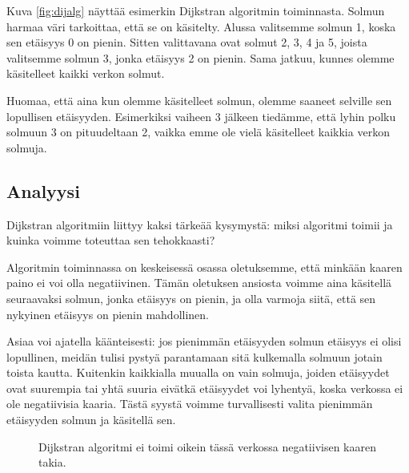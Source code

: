Kuva \ref{fig:dijalg} näyttää esimerkin Dijkstran algoritmin
toiminnasta.
Solmun harmaa väri tarkoittaa, että se on käsitelty.
Alussa valitsemme solmun 1, koska sen etäisyys 0 on pienin.
Sitten valittavana ovat solmut 2, 3, 4 ja 5,
joista valitsemme solmun 3, jonka etäisyys 2 on pienin.
Sama jatkuu, kunnes olemme käsitelleet kaikki verkon solmut.

Huomaa, että aina kun olemme käsitelleet solmun,
olemme saaneet selville sen lopullisen etäisyyden.
Esimerkiksi vaiheen 3 jälkeen tiedämme,
että lyhin polku solmuun 3 on pituudeltaan 2,
vaikka emme ole vielä käsitelleet kaikkia verkon solmuja.

\subsection{Analyysi}

Dijkstran algoritmiin liittyy kaksi tärkeää kysymystä:
miksi algoritmi toimii ja kuinka voimme toteuttaa sen tehokkaasti?

Algoritmin toiminnassa on keskeisessä osassa oletuksemme,
että minkään kaaren paino ei voi olla negatiivinen.
Tämän oletuksen ansiosta voimme aina käsitellä seuraavaksi solmun,
jonka etäisyys on pienin, ja olla varmoja siitä, että sen nykyinen
etäisyys on pienin mahdollinen.

Asiaa voi ajatella käänteisesti: jos pienimmän etäisyyden solmun
etäisyys ei olisi lopullinen, meidän tulisi pystyä parantamaan
sitä kulkemalla solmuun jotain toista kautta.
Kuitenkin kaikkialla muualla on vain solmuja, joiden etäisyydet
ovat suurempia tai yhtä suuria eivätkä etäisyydet voi lyhentyä,
koska verkossa ei ole negatiivisia kaaria.
Tästä syystä voimme turvallisesti valita pienimmän etäisyyden
solmun ja käsitellä sen.

\begin{figure}
\center
\begin{center}
\end{center}
\caption{Dijkstran algoritmi ei toimi oikein tässä verkossa
negatiivisen kaaren takia.}
\label{fig:dijneg}
\end{figure}

